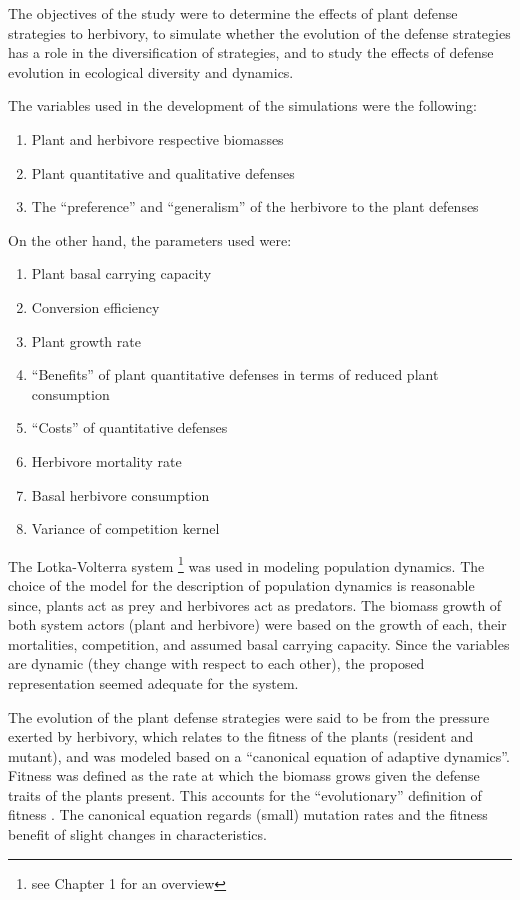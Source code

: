 The objectives of the study were to determine the effects of plant defense strategies to herbivory,
to simulate whether the evolution of the defense strategies has a role in the diversification of strategies,
and to study the effects of defense evolution in ecological diversity and dynamics.

The variables used in the development of the simulations were the following:

\begin{enumerate}
    \item Plant and herbivore respective biomasses
    \item Plant quantitative and qualitative defenses
    \item The ``preference'' and ``generalism'' of the herbivore to the plant defenses
\end{enumerate}

On the other hand, the parameters used were:

\begin{enumerate}
    \item Plant basal carrying capacity
    \item Conversion efficiency
    \item Plant growth rate
    \item ``Benefits'' of plant quantitative defenses in terms of reduced plant consumption
    \item ``Costs'' of quantitative defenses
    \item Herbivore mortality rate
    \item Basal herbivore consumption
    \item Variance of competition kernel
\end{enumerate}

The Lotka-Volterra system \footnote{see Chapter 1 for an overview} was used in modeling population dynamics.
The choice of the model for the description of population dynamics is reasonable since, plants act as prey and herbivores act as predators.
The biomass growth of both system actors (plant and herbivore) were based on the growth of each, their mortalities, competition, and assumed basal carrying capacity.
Since the variables are dynamic (they change with respect to each other), the proposed representation seemed adequate for the system.

The evolution of the plant defense strategies were said to be from the pressure exerted by herbivory, which relates to the fitness of the plants (resident and mutant),
and was modeled based on a ``canonical equation of adaptive dynamics''.
Fitness was defined as the rate at which the biomass grows given the defense traits of the plants present.
This accounts for the ``evolutionary'' definition of fitness \cite{Ridley}.
The canonical equation regards (small) mutation rates and the fitness benefit of slight changes in characteristics.

